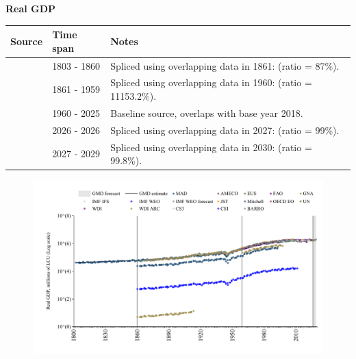 \documentclass[12pt,a4paper,landscape]{article}
\begin{document}
\begin{adjustbox}{max totalsize={\paperwidth}{\paperheight},center}
\begin{minipage}[t][\textheight][t]{\textwidth}
\vspace*{0.5cm}
{}
\begin{center}
{\Large\bfseries Real GDP}
\end{center}
\vspace{0.5cm}
\begin{table}[H]
\centering
\small
\begin{tabular}{|l|l|l|}
\hline
\textbf{Source} & \textbf{Time span} & \textbf{Notes} \\
\hline
\rowcolor{white}\cite{MAD}& 1803 - 1860 &Spliced using overlapping data in 1861: (ratio = 87\%). \\
\rowcolor{lightgray}\cite{CS1_ITA}& 1861 - 1959 &Spliced using overlapping data in 1960: (ratio = 11153.2\%). \\
\rowcolor{white}\cite{OECD_EO}& 1960 - 2025 &Baseline source, overlaps with base year 2018. \\
\rowcolor{lightgray}\cite{AMECO}& 2026 - 2026 &Spliced using overlapping data in 2027: (ratio = 99\%). \\
\rowcolor{white}\cite{IMF_WEO_forecast}& 2027 - 2029 &Spliced using overlapping data in 2030: (ratio = 99.8\%). \\
\hline
\end{tabular}
\end{table}
\begin{figure}[H]
\centering
\includegraphics[width=\textwidth,height=0.6\textheight,keepaspectratio]{graphs/ITA_rGDP.pdf}
\end{figure}
\end{minipage}
\end{adjustbox}
\end{document}
